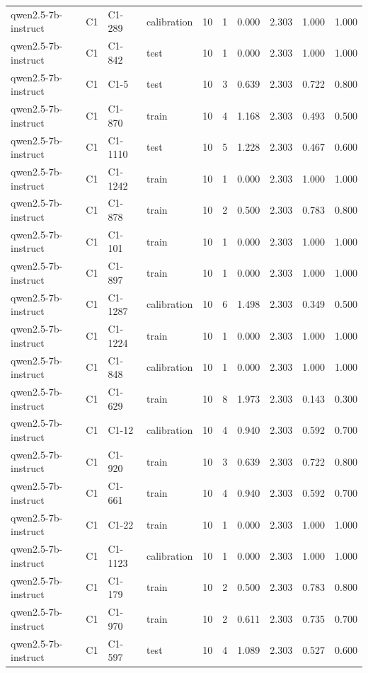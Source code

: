 \begin{table}
\begin{tabular}{llllrrrrrr}
qwen2.5-7b-instruct & C1 & C1-289 & calibration & 10 & 1 & 0.000 & 2.303 & 1.000 & 1.000 \\
qwen2.5-7b-instruct & C1 & C1-842 & test & 10 & 1 & 0.000 & 2.303 & 1.000 & 1.000 \\
qwen2.5-7b-instruct & C1 & C1-5 & test & 10 & 3 & 0.639 & 2.303 & 0.722 & 0.800 \\
qwen2.5-7b-instruct & C1 & C1-870 & train & 10 & 4 & 1.168 & 2.303 & 0.493 & 0.500 \\
qwen2.5-7b-instruct & C1 & C1-1110 & test & 10 & 5 & 1.228 & 2.303 & 0.467 & 0.600 \\
qwen2.5-7b-instruct & C1 & C1-1242 & train & 10 & 1 & 0.000 & 2.303 & 1.000 & 1.000 \\
qwen2.5-7b-instruct & C1 & C1-878 & train & 10 & 2 & 0.500 & 2.303 & 0.783 & 0.800 \\
qwen2.5-7b-instruct & C1 & C1-101 & train & 10 & 1 & 0.000 & 2.303 & 1.000 & 1.000 \\
qwen2.5-7b-instruct & C1 & C1-897 & train & 10 & 1 & 0.000 & 2.303 & 1.000 & 1.000 \\
qwen2.5-7b-instruct & C1 & C1-1287 & calibration & 10 & 6 & 1.498 & 2.303 & 0.349 & 0.500 \\
qwen2.5-7b-instruct & C1 & C1-1224 & train & 10 & 1 & 0.000 & 2.303 & 1.000 & 1.000 \\
qwen2.5-7b-instruct & C1 & C1-848 & calibration & 10 & 1 & 0.000 & 2.303 & 1.000 & 1.000 \\
qwen2.5-7b-instruct & C1 & C1-629 & train & 10 & 8 & 1.973 & 2.303 & 0.143 & 0.300 \\
qwen2.5-7b-instruct & C1 & C1-12 & calibration & 10 & 4 & 0.940 & 2.303 & 0.592 & 0.700 \\
qwen2.5-7b-instruct & C1 & C1-920 & train & 10 & 3 & 0.639 & 2.303 & 0.722 & 0.800 \\
qwen2.5-7b-instruct & C1 & C1-661 & train & 10 & 4 & 0.940 & 2.303 & 0.592 & 0.700 \\
qwen2.5-7b-instruct & C1 & C1-22 & train & 10 & 1 & 0.000 & 2.303 & 1.000 & 1.000 \\
qwen2.5-7b-instruct & C1 & C1-1123 & calibration & 10 & 1 & 0.000 & 2.303 & 1.000 & 1.000 \\
qwen2.5-7b-instruct & C1 & C1-179 & train & 10 & 2 & 0.500 & 2.303 & 0.783 & 0.800 \\
qwen2.5-7b-instruct & C1 & C1-970 & train & 10 & 2 & 0.611 & 2.303 & 0.735 & 0.700 \\
qwen2.5-7b-instruct & C1 & C1-597 & test & 10 & 4 & 1.089 & 2.303 & 0.527 & 0.600 \\

\end{tabular}
\end{table}
